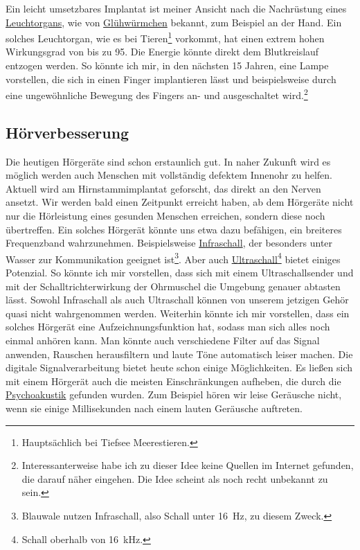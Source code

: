 Ein leicht umsetzbares Implantat ist meiner Ansicht nach die Nachrüstung eines
\href{http://de.wikipedia.org/wiki/Leuchtorgane}{Leuchtorgans}, wie von
\href{http://de.wikipedia.org/wiki/Leuchtkäfer}{Glühwürmchen} bekannt, zum Beispiel an der Hand. Ein
solches Leuchtorgan, wie es bei Tieren\footnote{Hauptsächlich bei Tiefsee Meerestieren.}
vorkommt, hat einen
extrem hohen Wirkungsgrad von bis zu 95\Prozent. Die Energie könnte direkt dem Blutkreislauf entzogen
werden. So könnte ich mir, in den nächsten 15 Jahren, eine Lampe
vorstellen, die sich in einen Finger implantieren lässt und beispielsweise durch eine ungewöhnliche
Bewegung des Fingers an- und ausgeschaltet wird.\footnote{Interessanterweise habe ich zu dieser Idee
keine Quellen im Internet gefunden, die darauf näher eingehen. Die Idee scheint als noch recht
unbekannt zu sein.}

\subsection{Hörverbesserung} %
\label{sec:Robin:future:hearing}
Die heutigen Hörgeräte sind schon erstaunlich gut.
In naher Zukunft wird es möglich werden auch Menschen mit vollständig defektem Innenohr zu helfen.
Aktuell wird am Hirnstammimplantat geforscht, das direkt an den Nerven ansetzt.
Wir werden bald einen Zeitpunkt erreicht haben, ab dem Hörgeräte nicht nur die Hörleistung eines gesunden
Menschen erreichen, sondern diese noch übertreffen.
Ein solches Hörgerät könnte uns etwa dazu befähigen, ein breiteres Frequenzband
wahrzunehmen. Beispielsweise \href{http://de.wikipedia.org/wiki/Infraschall}{Infraschall}, der
besonders unter Wasser zur Kommunikation geeignet ist\footnote{Blauwale nutzen Infraschall, also
Schall unter \SI{16}{\hertz}, zu diesem Zweck.}. Aber auch
\href{http://de.wikipedia.org/wiki/Ultraschall}{Ultraschall}\footnote{Schall oberhalb von
\SI{16}{\kilo\hertz}.} bietet einiges Potenzial. So könnte ich mir vorstellen, dass sich mit einem
Ultraschallsender und mit der Schalltrichterwirkung der Ohrmuschel die Umgebung genauer abtasten
lässt. Sowohl Infraschall als auch Ultraschall können von unserem jetzigen Gehör quasi nicht
wahrgenommen werden. Weiterhin könnte ich mir vorstellen, dass ein solches Hörgerät eine
Aufzeichnungsfunktion hat, sodass man sich alles noch einmal anhören kann. Man könnte auch
verschiedene Filter auf das Signal anwenden, Rauschen herausfiltern und laute Töne automatisch leiser
machen. Die digitale Signalverarbeitung bietet heute schon einige Möglichkeiten.
Es ließen sich mit einem Hörgerät auch die meisten Einschränkungen aufheben, die durch die
\href{http://de.wikipedia.org/wiki/Psychoakustik}{Psychoakustik} gefunden wurden. Zum Beispiel hören
wir leise Geräusche nicht, wenn sie einige Millisekunden nach einem lauten Geräusche auftreten.

